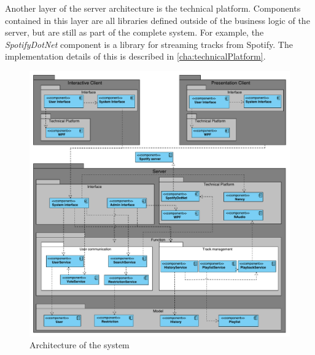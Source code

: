 Another layer of the server architecture is the
technical platform. Components contained in this layer are all
libraries defined outside of the business logic of the server, but are
still as part of the complete system. For example, the
\textit{SpotifyDotNet} component is a library for streaming tracks from
Spotify. The implementation details of this is described in
\cref{cha:technicalPlatform}.
\begin{figure}[H]
  \centering
  \includegraphics[width=1.2\linewidth]{Images/Arkitektur.pdf}
  \caption{Architecture of the system}\label{fig:architecture}
\end{figure}
